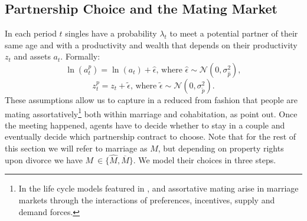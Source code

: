 \documentclass[12pt]{article}
\numberwithin{table}{section}
\begin{document}
\subsection{Partnership Choice and the Mating Market}\label{ssec:marriage_market}
In each period $t$ singles have a probability $\lambda_t$ to meet a potential partner of their same age and with a productivity and wealth that depends on their productivity $z_t$ and assets $a_{t}$. Formally:
\begin{equation}\label{mma}
\ln(a^p_t)=\ln(a_{t})+\hat{\epsilon}\text{, where }\hat{\epsilon}\sim\mathcal{N}(0,\sigma^2_{\hat{p}}),
\end{equation}
\begin{equation}\label{mmz}
z^p_t=z_{t}+\tilde{\epsilon}\text{, where }\tilde{\epsilon}\sim\mathcal{N}(0,\sigma^2_{\tilde{p}}).
\end{equation}
These assumptions allow us to capture in a reduced from fashion that people are mating assortatively\footnote{In the life cycle models featured in \cite{ciscato2019}, \cite{shephard2019} and \cite{reynoso2019} assortative mating arise in marriage markets through the interactions of preferences, incentives, supply and demand forces.} both within marriage and cohabitation, as \cite{gemici2014} point out.
Once the meeting happened, agents have to decide whether to stay in a couple and eventually decide which partnership contract to choose. Note that for the rest of this section we will refer to marriage as $M$, but depending on property rights upon divorce we have $M \ \in\{\hat{M},\overline{M}\}$. We model their choices in three steps. 
\end{document}
